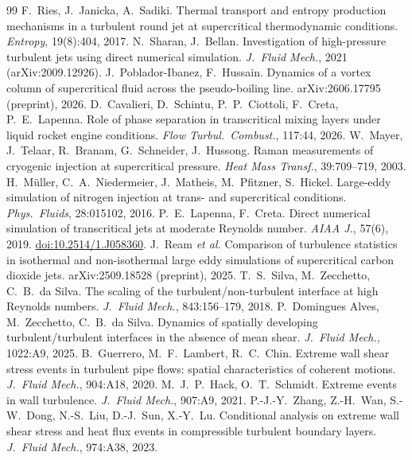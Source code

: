 \documentclass[11pt]{article}
\begin{document}
\begin{thebibliography}{99}
 F.\ Ries, J.\ Janicka, A.\ Sadiki. Thermal transport and entropy production mechanisms in a turbulent round jet at supercritical thermodynamic conditions. \emph{Entropy}, 19(8):404, 2017.
 N.\ Sharan, J.\ Bellan. Investigation of high-pressure turbulent jets using direct numerical simulation. \emph{J.\ Fluid Mech.}, 2021 (arXiv:2009.12926).
 J.\ Poblador-Ibanez, F.\ Hussain. Dynamics of a vortex column of supercritical fluid across the pseudo-boiling line. arXiv:2606.17795 (preprint), 2026.
 D.\ Cavalieri, D.\ Schintu, P.\ P.\ Ciottoli, F.\ Creta, P.\ E.\ Lapenna. Role of phase separation in transcritical mixing layers under liquid rocket engine conditions. \emph{Flow Turbul.\ Combust.}, 117:44, 2026.
 W.\ Mayer, J.\ Telaar, R.\ Branam, G.\ Schneider, J.\ Hussong. Raman measurements of cryogenic injection at supercritical pressure. \emph{Heat Mass Transf.}, 39:709--719, 2003.
 H.\ M\"uller, C.\ A.\ Niedermeier, J.\ Matheis, M.\ Pfitzner, S.\ Hickel. Large-eddy simulation of nitrogen injection at trans- and supercritical conditions. \emph{Phys.\ Fluids}, 28:015102, 2016.
 P.\ E.\ Lapenna, F.\ Creta. Direct numerical simulation of transcritical jets at moderate Reynolds number. \emph{AIAA J.}, 57(6), 2019. \href{https://doi.org/10.2514/1.J058360}{doi:10.2514/1.J058360}.
 J.\ Ream \emph{et al.} Comparison of turbulence statistics in isothermal and non-isothermal large eddy simulations of supercritical carbon dioxide jets. arXiv:2509.18528 (preprint), 2025.
 T.\ S.\ Silva, M.\ Zecchetto, C.\ B.\ da Silva. The scaling of the turbulent/non-turbulent interface at high Reynolds numbers. \emph{J.\ Fluid Mech.}, 843:156--179, 2018.
 P.\ Domingues Alves, M.\ Zecchetto, C.\ B.\ da Silva. Dynamics of spatially developing turbulent/turbulent interfaces in the absence of mean shear. \emph{J.\ Fluid Mech.}, 1022:A9, 2025.
 B.\ Guerrero, M.\ F.\ Lambert, R.\ C.\ Chin. Extreme wall shear stress events in turbulent pipe flows: spatial characteristics of coherent motions. \emph{J.\ Fluid Mech.}, 904:A18, 2020.
 M.\ J.\ P.\ Hack, O.\ T.\ Schmidt. Extreme events in wall turbulence. \emph{J.\ Fluid Mech.}, 907:A9, 2021.
 P.-J.-Y.\ Zhang, Z.-H.\ Wan, S.-W.\ Dong, N.-S.\ Liu, D.-J.\ Sun, X.-Y.\ Lu. Conditional analysis on extreme wall shear stress and heat flux events in compressible turbulent boundary layers. \emph{J.\ Fluid Mech.}, 974:A38, 2023.

\end{thebibliography}
\end{document}
